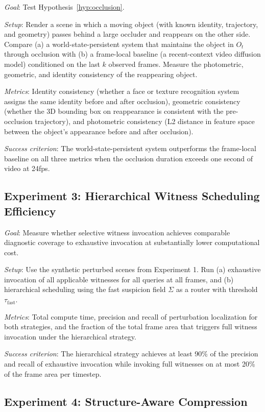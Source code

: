 \documentclass[12pt,a4paper]{article}
\theoremstyle{plain}
\theoremstyle{definition}
\theoremstyle{remark}
\begin{document}
\textit{Goal}: Test Hypothesis~\ref{hyp:occlusion}.

\textit{Setup}: Render a scene in which a moving object (with known identity, trajectory, and geometry) passes behind a large occluder and reappears on the other side. Compare (a) a world-state-persistent system that maintains the object in $O_t$ through occlusion with (b) a frame-local baseline (a recent-context video diffusion model) conditioned on the last $k$ observed frames. Measure the photometric, geometric, and identity consistency of the reappearing object.

\textit{Metrics}: Identity consistency (whether a face or texture recognition system assigns the same identity before and after occlusion), geometric consistency (whether the 3D bounding box on reappearance is consistent with the pre-occlusion trajectory), and photometric consistency (L2 distance in feature space between the object's appearance before and after occlusion).

\textit{Success criterion}: The world-state-persistent system outperforms the frame-local baseline on all three metrics when the occlusion duration exceeds one second of video at 24fps.

\subsection{Experiment 3: Hierarchical Witness Scheduling Efficiency}

\textit{Goal}: Measure whether selective witness invocation achieves comparable diagnostic coverage to exhaustive invocation at substantially lower computational cost.

\textit{Setup}: Use the synthetic perturbed scenes from Experiment 1. Run (a) exhaustive invocation of all applicable witnesses for all queries at all frames, and (b) hierarchical scheduling using the fast suspicion field $\Sigma$ as a router with threshold $\tau_{\mathrm{fast}}$.

\textit{Metrics}: Total compute time, precision and recall of perturbation localization for both strategies, and the fraction of the total frame area that triggers full witness invocation under the hierarchical strategy.

\textit{Success criterion}: The hierarchical strategy achieves at least 90\% of the precision and recall of exhaustive invocation while invoking full witnesses on at most 20\% of the frame area per timestep.

\subsection{Experiment 4: Structure-Aware Compression}
\end{document}
